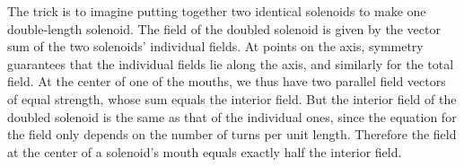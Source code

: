 The trick is to imagine putting together two identical
solenoids to make one double-length solenoid. The field of
the doubled solenoid is given by the vector sum of the two
solenoids' individual fields. At points on the axis,
symmetry guarantees that the individual fields lie along the
axis, and similarly for the total field. At the center of
one of the mouths, we thus have two parallel field vectors
of equal strength, whose sum equals the interior field. But
the interior field of the doubled solenoid is the same as
that of the individual ones, since the equation for the
field only depends on the number of turns per unit length.
Therefore the field at the center of a solenoid's mouth
equals exactly half the interior field.



